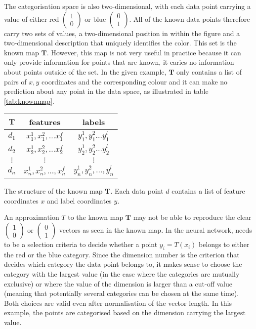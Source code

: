 \documentclass[a4paper, justified]{tufte-handout}
\begin{document}
The categorisation space is also two-dimensional, with each data point carrying a value of either red $(\begin{smallmatrix} 1\\0\end{smallmatrix})$ or blue $(\begin{smallmatrix} 0\\1\end{smallmatrix})$. All of the known data points therefore carry two sets of values, a two-dimensional position in within the figure and a two-dimensional description that uniquely identifies the color. This set is the known map $\mathbf{T}$. However, this map is not very useful in practice because it can only provide information for points that are known, it caries no information about points outside of the set. In the given example, $\mathbf{T}$ only contains a list of pairs of $x, y$ coordinates and the corresponding colour and it can make no prediction about any point in the data space, as illustrated in table \ref{tab:knownmap}.

\begin{margintable}
\begin{tabular}{c| c c}
$\mathbf{T}$	& features & labels\\\hline
$d_1$		& $x_1^1, x_1^2, \ldots x_1^f$ & $y_1^1, y_1^2\ldots y_1^l$\\
$d_2$		& $x_2^1, x_2^2, \ldots x_2^f$ & $y_2^1, y_2^2\ldots y_2^l$\\
$\vdots$ & $ \vdots $ & $\vdots$\\
$d_n$ & $x_n^1, x_n^2, \ldots, x_n^f$ & $y_n^1, y_n^2, \ldots, y_n^l$
\end{tabular}
\caption{The structure of the known map $\mathbf{T}$. Each data point $d$ contains a list of feature coordinates $x$ and label coordinates $y$.}\label{tab:knownmap}
\end{margintable}



An approximation $T$ to the known map $\mathbf{T}$ may not be able to reproduce the clear $(\begin{smallmatrix} 1\\0\end{smallmatrix})$ or $(\begin{smallmatrix} 0\\1\end{smallmatrix})$ vectors as seen in the known map. In the neural network, needs to be a selection criteria to decide whether a point $y_i = T(x_i)$ belongs to either the red or the blue category. Since the dimension number is the criterion that decides which category the data point belongs to, it makes sense to choose the category with the largest value (in the case where the categories are mutually exclusive) or where the value of the dimension is larger than a cut-off value (meaning that potentially several categories can be chosen at the same time). Both choices are valid even after normalisation of the vector length. In this example, the points are categorised based on the dimension carrying the largest value.
\end{document}
